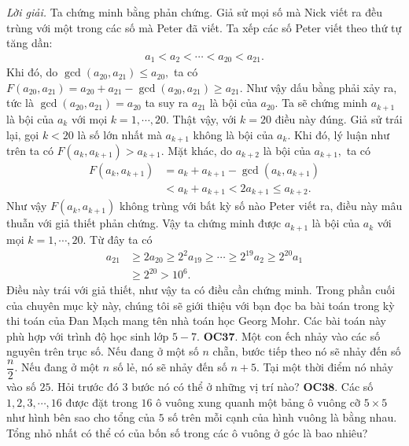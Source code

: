 \begin{multicols}{2}
	\vskip 0.1cm
	\textit{Lời giải.} Ta chứng minh bằng phản chứng. Giả sử mọi số mà Nick viết ra đều trùng với một trong các số mà Peter đã viết. Ta xếp các số Peter viết theo thứ tự tăng dần:
	\begin{align*}
		a_1 < a_2 < \cdots < a_{20} < a_{21}.
	\end{align*}
	Khi đó, do $\gcd (a_{20}, a_{21}) \le a_{20},$ ta có  $F(a_{20}, a_{21}) = a_{20} + a_{21} - \gcd (a_{20}, a_{21})\ge a_{21}.$ Như vậy dấu bằng phải xảy ra, tức là $\gcd (a_{20}, a_{21}) = a_{20}$ ta suy ra $a_{21}$ là bội của $a_{20}.$
	\vskip 0.1cm
	Ta sẽ chứng minh $a_{k+1}$ là bội của $a_k$ với mọi $k=1, \cdots, 20.$ Thật vậy, với $k=20$ điều này đúng. Giả sử trái lại, gọi $k<20$ là số lớn nhất mà $a_{k+1}$ không là bội của $a_k.$ Khi đó, lý luận như trên ta có $F(a_{k}, a_{k+1})>a_{k+1}$. Mặt khác, do $a_{k+2}$ là bội của $a_{k+1},$ ta có 
	\begin{align*}
		F(a_{k}, a_{k+1}) &= a_{k} + a_{k+1} - \gcd (a_{k}, a_{k+1})\\
		&<  a_{k} + a_{k+1}< 2a_{k+1}\le a_{k+2}.
	\end{align*}
	Như vậy $F(a_{k}, a_{k+1})$ không trùng với bất kỳ số nào Peter viết ra, điều này mâu thuẫn với giả thiết phản chứng. Vậy ta chứng minh được $a_{k+1}$ là bội của $a_k$ với mọi $k=1, \cdots, 20.$
	\vskip 0.1cm
	Từ đây ta có
	\begin{align*}
		a_{21}&\ge 2a_{20} \ge 2^2 a_{19} \ge \cdots \ge 2^{19}a_2 \ge 2^{20}a_1\\
		&\ge 2^{20}>10^6.
	\end{align*}
	Điều này trái với giả thiết, như vậy ta có điều cần chứng minh. 
	\vskip 0.1cm
	Trong phần cuối của chuyên mục kỳ này, chúng tôi sẽ giới thiệu với bạn đọc ba bài toán trong kỳ thi toán của Đan Mạch mang tên nhà toán học Georg Mohr. Các bài toán này phù hợp với trình độ học sinh lớp $5-7$.
	\vskip 0.1cm
	{\bf\color{cackithi} OC$\pmb{37.}$} Một con ếch nhảy vào các số nguyên trên trục số. Nếu đang ở một số $n$ chẵn, bước tiếp theo nó sẽ nhảy đến số $\dfrac{n}{2}.$ Nếu đang ở một $n$ số lẻ, nó sẽ nhảy đến số $n + 5$. Tại một thời điểm nó nhảy vào số $25$. Hỏi trước đó $3$ bước nó có thể ở những vị trí nào?
	\vskip 0.1cm
	{\bf\color{cackithi} OC$\pmb{38.}$} Các số $1, 2, 3, \cdots, 16$  được đặt trong $16$ ô vuông xung quanh một bảng ô vuông cỡ $5\times 5$ như hình bên sao cho tổng của $5$ số trên mỗi cạnh của hình vuông là bằng nhau. 
	Tổng nhỏ nhất có thể có của bốn số trong các ô vuông ở góc là bao nhiêu?
	\begin{figure}[H]

\end{figure}
\end{multicols}
